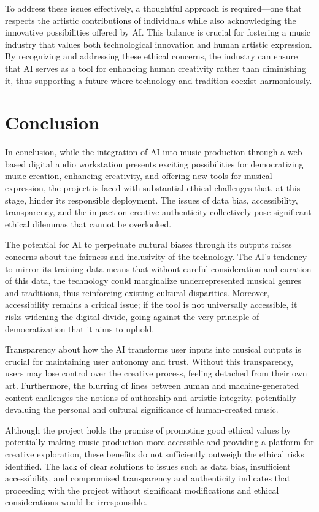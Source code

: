 \documentclass[10pt,twocolumn]{article}
\begin{document}
To address these issues effectively, a thoughtful approach is required—one that respects the artistic contributions of individuals while also acknowledging the innovative possibilities offered by AI. This balance is crucial for fostering a music industry that values both technological innovation and human artistic expression. By recognizing and addressing these ethical concerns, the industry can ensure that AI serves as a tool for enhancing human creativity rather than diminishing it, thus supporting a future where technology and tradition coexist harmoniously.
\section{Conclusion}
In conclusion, while the integration of AI into music production through a web-based digital audio workstation presents exciting possibilities for democratizing music creation, enhancing creativity, and offering new tools for musical expression, the project is faced with substantial ethical challenges that, at this stage, hinder its responsible deployment. The issues of data bias, accessibility, transparency, and the impact on creative authenticity collectively pose significant ethical dilemmas that cannot be overlooked.

The potential for AI to perpetuate cultural biases through its outputs raises concerns about the fairness and inclusivity of the technology. The AI’s tendency to mirror its training data means that without careful consideration and curation of this data, the technology could marginalize underrepresented musical genres and traditions, thus reinforcing existing cultural disparities. Moreover, accessibility remains a critical issue; if the tool is not universally accessible, it risks widening the digital divide, going against the very principle of democratization that it aims to uphold.

Transparency about how the AI transforms user inputs into musical outputs is crucial for maintaining user autonomy and trust. Without this transparency, users may lose control over the creative process, feeling detached from their own art. Furthermore, the blurring of lines between human and machine-generated content challenges the notions of authorship and artistic integrity, potentially devaluing the personal and cultural significance of human-created music.

Although the project holds the promise of promoting good ethical values by potentially making music production more accessible and providing a platform for creative exploration, these benefits do not sufficiently outweigh the ethical risks identified. The lack of clear solutions to issues such as data bias, insufficient accessibility, and compromised transparency and authenticity indicates that proceeding with the project without significant modifications and ethical considerations would be irresponsible.
\end{document}

